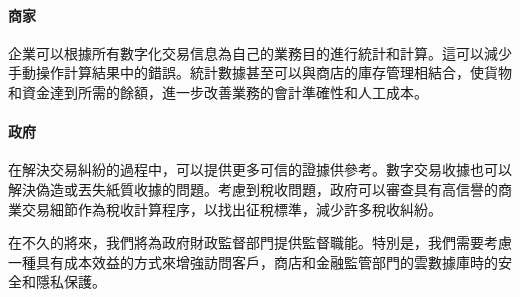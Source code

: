 		\paragraph{商家}企業可以根據所有數字化交易信息為自己的業務目的進行統計和計算。這可以減少手動操作計算結果中的錯誤。統計數據甚至可以與商店的庫存管理相結合，使貨物和資金達到所需的餘額，進一步改善業務的會計準確性和人工成本。
		\paragraph{政府}在解決交易糾紛的過程中，可以提供更多可信的證據供參考。數字交易收據也可以解決偽造或丟失紙質收據的問題。考慮到稅收問題，政府可以審查具有高信譽的商業交易細節作為稅收計算程序，以找出征稅標準，減少許多稅收糾紛。

在不久的將來，我們將為政府財政監督部門提供監督職能。特別是，我們需要考慮一種具有成本效益的方式來增強訪問客戶，商店和金融監管部門的雲數據庫時的安全和隱私保護。

